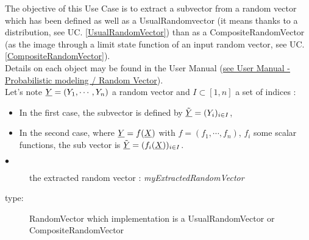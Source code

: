 \renewcommand{\filename}{docUC_OVI_RVExtraction.tex}
\renewcommand{\filetitle}{UC : Extraction of a random subvector from a random vector}

\HeaderIIILevel



The objective of this Use Case is to extract a subvector from a random vector which has been defined as well  as a UsualRandomvector (it means thanks to a distribution, see UC. \ref{UsualRandomVector}) than  as a CompositeRandomVector (as the image through a limit state function of an input  random vector, see UC. \ref{CompositeRandomVector}).\\

Details on each object may be found in the User Manual  (\href{OpenTURNS_UserManual_TUI.pdf}{see User Manual - Probabilistic modeling / Random Vector}).\\



Let's note ${\underline{Y}} = (Y_1, \cdots, Y_n)$ a random vector and $I \subset [1, n]$ a set of indices :
\begin{itemize}
\item In the first case, the subvector is defined by ${\underline{\tilde{Y}}} = (Y_i)_{i \in I}$,
\item In the second case, where ${\underline{Y}} = f({\underline{X}})$ with $f = (f_1, \cdots, f_n)$, $f_i$ some scalar functions, the sub vector is ${\underline{\tilde{Y}}} = (f_i({\underline{X}}))_{i \in I}$.
\end{itemize}


\noindent%
{
  \begin{description}
  \item[$\bullet$] the extracted random vector : {\itshape myExtractedRandomVector}
  \item[type:] RandomVector which implementation is a UsualRandomVector or CompositeRandomVector
  \end{description}
}

